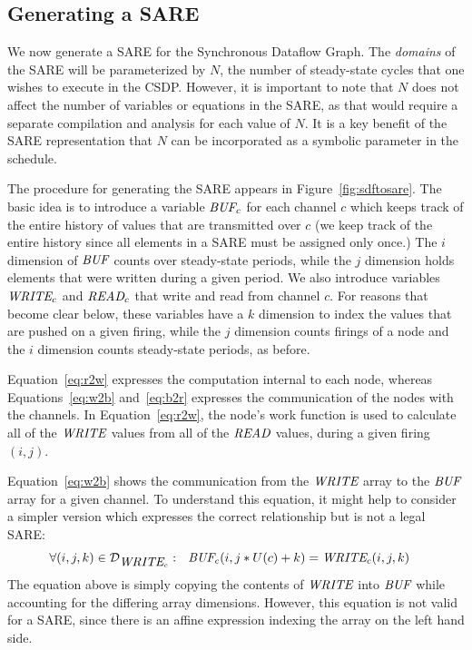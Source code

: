 \subsection{Generating a SARE}
\label{sec:simplesare}

We now generate a SARE for the Synchronous Dataflow Graph.  The {\it
domains} of the SARE will be parameterized by $N$, the number of
steady-state cycles that one wishes to execute in the CSDP.  However,
it is important to note that $N$ does not affect the number of
variables or equations in the SARE, as that would require a separate
compilation and analysis for each value of $N$.  It is a key benefit
of the SARE representation that $N$ can be incorporated as a symbolic
parameter in the schedule.

The procedure for generating the SARE appears in
Figure~\ref{fig:sdftosare}.  The basic idea is to introduce a variable
$\mbox{\it BUF}_c$ for each channel $c$ which keeps track of the entire
history of values that are transmitted over $c$ (we keep track of the
entire history since all elements in a SARE must be assigned only
once.)  The $i$ dimension of $\mbox{\it BUF}$ counts over steady-state
periods, while the $j$ dimension holds elements that were written
during a given period.  We also introduce variables $\mbox{\it WRITE}_c$ and
$\mbox{\it READ}_c$ that write and read from channel $c$.  For reasons that
become clear below, these variables have a $k$ dimension to index the
values that are pushed on a given firing, while the $j$ dimension
counts firings of a node and the $i$ dimension counts steady-state
periods, as before.

Equation~\ref{eq:r2w} expresses the computation internal to each node,
whereas Equations~\ref{eq:w2b} and~\ref{eq:b2r} expresses the
communication of the nodes with the channels.  In
Equation~\ref{eq:r2w}, the node's work function is used to calculate
all of the $\mbox{\it WRITE}$ values from all of the $\mbox{\it READ}$ values,
during a given firing $(i,j)$. 

Equation~\ref{eq:w2b} shows the communication from the $\mbox{\it WRITE}$
array to the $\mbox{\it BUF}$ array for a given channel.  To understand this
equation, it might help to consider a simpler version which expresses
the correct relationship but is not a legal SARE:
{\small
\begin{align*}
&\forall (i,j,k) \in {\cal D}_{\mt{WRITE}_c}:~~
\mt{BUF}_{c}(i,j*U(c)+k) = \mt{WRITE}_{c}(i, j, k)
\end{align*}}
The equation above is simply copying the contents of $\mbox{\it WRITE}$ into
$\mbox{\it BUF}$ while accounting for the differing array dimensions.
However, this equation is not valid for a SARE, since there is an
affine expression indexing the array on the left hand side.

